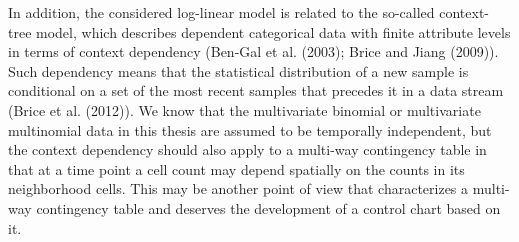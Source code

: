 In addition, the considered log-linear model is related to the so-called
context-tree model, which describes dependent categorical data with finite attribute
levels in terms of context dependency (Ben-Gal et al. (2003); Brice and Jiang
(2009)). Such dependency means that the statistical distribution of a new sample is
conditional on a set of the most recent samples that precedes it in a data stream
(Brice et al. (2012)). We know that the multivariate binomial or multivariate
multinomial data in this thesis are assumed to be temporally independent, but the
context dependency should also apply to a multi-way contingency table in that at a
time point a cell count may depend spatially on the counts in its neighborhood
cells. This may be another point of view that characterizes a multi-way contingency
table and deserves the development of a control chart based on it.
